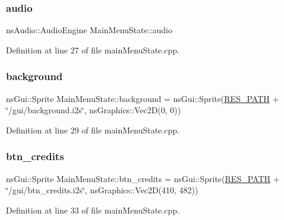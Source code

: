 \mbox{\label{class_main_menu_state_ab3d896522cecaf5f804f2b433ff102f1}} 
\subsubsection{\texorpdfstring{audio}{audio}}
{\footnotesize\ttfamily ns\+Audio\+::\+Audio\+Engine Main\+Menu\+State\+::audio}



Definition at line 27 of file main\+Menu\+State.\+cpp.

\mbox{\label{class_main_menu_state_a0cc76e15a2093e406857db39a65ea301}} 
\subsubsection{\texorpdfstring{background}{background}}
{\footnotesize\ttfamily ns\+Gui\+::\+Sprite Main\+Menu\+State\+::background = ns\+Gui\+::\+Sprite(\hyperlink{definitions_8h_a793644bd88146828177a2a4f57e3bf01}{R\+E\+S\+\_\+\+P\+A\+TH} + \char`\"{}/gui/background.\+i2s\char`\"{}, ns\+Graphics\+::\+Vec2D(0, 0))}



Definition at line 29 of file main\+Menu\+State.\+cpp.

\mbox{\label{class_main_menu_state_a185ced99223cda9bc631685a7d5fde89}} 
\subsubsection{\texorpdfstring{btn\+\_\+credits}{btn\_credits}}
{\footnotesize\ttfamily ns\+Gui\+::\+Sprite Main\+Menu\+State\+::btn\+\_\+credits = ns\+Gui\+::\+Sprite(\hyperlink{definitions_8h_a793644bd88146828177a2a4f57e3bf01}{R\+E\+S\+\_\+\+P\+A\+TH} + \char`\"{}/gui/btn\+\_\+credits.\+i2s\char`\"{}, ns\+Graphics\+::\+Vec2D(410, 482))}



Definition at line 33 of file main\+Menu\+State.\+cpp.

